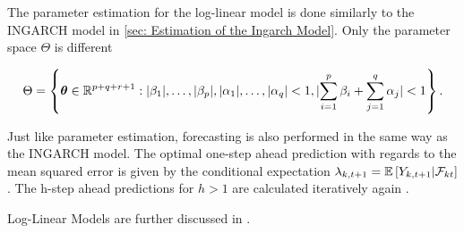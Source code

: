 The parameter estimation for the log-linear model is done similarly to the INGARCH model in \ref{sec: Estimation of the Ingarch Model}. Only the parameter space $\Theta$ is different

\begin{equation}
\Theta = \left\{ \bm{\theta} \in \mathbb{R}^{p+q+r+1}: \lvert\beta_1\rvert,\ldots,\lvert\beta_p\rvert,\lvert\alpha_1\rvert,\ldots,\lvert\alpha_q\rvert < 1, \lvert\sum_{i=1}^p\beta_i + \sum_{j=1}^q\alpha_j \rvert < 1 \right\}.
\label{eq:Parameter Space log-linear}
\end{equation}

Just like parameter estimation, forecasting is also performed in the same way as the INGARCH model. The optimal one-step ahead prediction with regards to the mean squared error is given by the conditional expectation $\lambda_{k,t+1}=\mathbb{E}\left[Y_{k,t+1} | \mathcal{F}_{kt} \right]$. The h-step ahead predictions for $h>1$ are calculated iteratively again \cite{Liboschik:2016}. 

Log-Linear Models are further discussed in \cite{Fokianos:2011,Woodard:2011,Douc:2013}.


%
%
%
%
%

